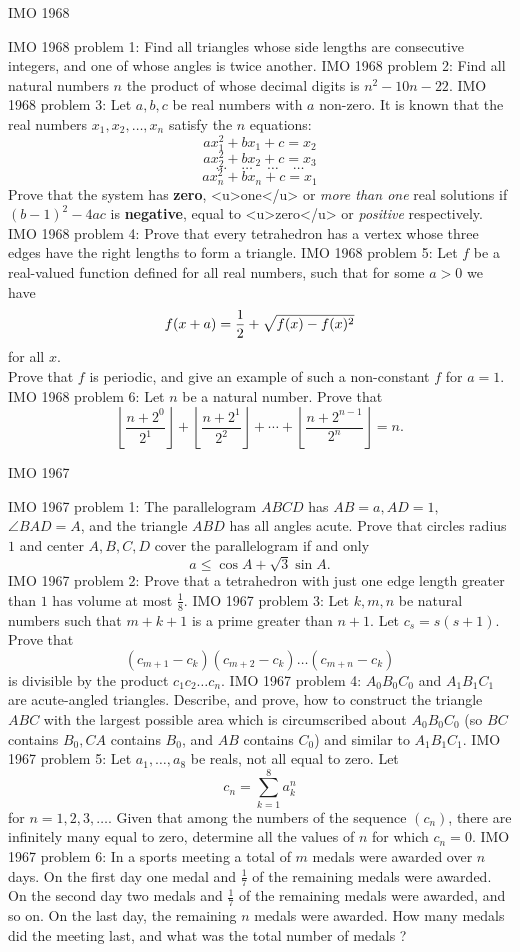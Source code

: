 IMO 1968 

IMO 1968 problem 1:  Find all triangles whose side lengths are consecutive integers, and one of whose angles is twice another. 
IMO 1968 problem 2:  Find all natural numbers $n$ the product of whose decimal digits is $n^2-10n-22$. 
IMO 1968 problem 3:  Let $a,b,c$ be real numbers with $a$ non-zero. It is known that the real numbers $x_1,x_2,\ldots,x_n$ satisfy the $n$ equations:
\[ ax_1^2+bx_1+c = x_2 \]
\[ ax_2^2+bx_2 +c = x_3 \]
\[ \ldots \quad \ldots \quad \ldots \quad \ldots \]
\[ ax_n^2+bx_n+c = x_1 \]
Prove that the system has \textbf{zero}, <u>one</u> or \textit{more than one} real solutions if $(b-1)^2-4ac$ is \textbf{negative}, equal to <u>zero</u> or \textit{positive} respectively. 
IMO 1968 problem 4:  Prove that every tetrahedron has a vertex whose three edges have the right lengths to form a triangle. 
IMO 1968 problem 5:  Let $f$ be a real-valued function defined for all real numbers, such that for some $a>0$ we have
\[ f(x+a)={1\over2}+\sqrt{f(x)-f(x)^2} \]
for all $x$. \\
Prove that $f$ is periodic, and give an example of such a non-constant $f$ for $a=1$. 
IMO 1968 problem 6: Let $n$ be a natural number. Prove that \[ \left\lfloor \frac{n+2^0}{2^1} \right\rfloor + \left\lfloor \frac{n+2^1}{2^2} \right\rfloor +\cdots +\left\lfloor \frac{n+2^{n-1}}{2^n}\right\rfloor =n. \]

IMO 1967 

IMO 1967 problem 1:  The parallelogram $ABCD$ has $AB=a,AD=1,$ $\angle BAD=A$, and the triangle $ABD$ has all angles acute. Prove that circles radius $1$ and center $A,B,C,D$ cover the parallelogram if and only
\[ a\le\cos A+\sqrt3\sin A. \] 
IMO 1967 problem 2:  Prove that a tetrahedron with just one edge length greater than $1$ has volume at most $ \frac{1}{8}.$ 
IMO 1967 problem 3:  Let $k,m,n$ be natural numbers such that $m+k+1$ is a prime greater than $n+1$. Let $c_s=s(s+1)$. Prove that
\[ (c_{m+1}-c_k)(c_{m+2}-c_k)\ldots(c_{m+n}-c_k) \]
is divisible by the product $c_1c_2\ldots c_n$. 
IMO 1967 problem 4:  $A_0B_0C_0$ and $A_1B_1C_1$ are acute-angled triangles. Describe, and prove, how to construct the triangle $ABC$ with the largest possible area which is circumscribed about $A_0B_0C_0$ (so $BC$ contains $B_0, CA$ contains $B_0$, and $AB$ contains $C_0$) and similar to $A_1B_1C_1.$ 
IMO 1967 problem 5:  Let $a_1,\ldots,a_8$ be reals, not all equal to zero. Let
\[ c_n = \sum^8_{k=1} a^n_k \]
for $n=1,2,3,\ldots$. Given that among the numbers of the sequence $(c_n)$, there are infinitely many equal to zero, determine all the values of $n$ for which $c_n = 0.$ 
IMO 1967 problem 6:  In a sports meeting a total of $m$ medals were awarded over $n$ days. On the first day one medal and $\frac{1}{7}$ of the remaining medals were awarded. On the second day two medals and $\frac{1}{7}$ of the remaining medals were awarded, and so on. On the last day, the remaining $n$ medals were awarded. How many medals did the meeting last, and what was the total number of medals ? 

